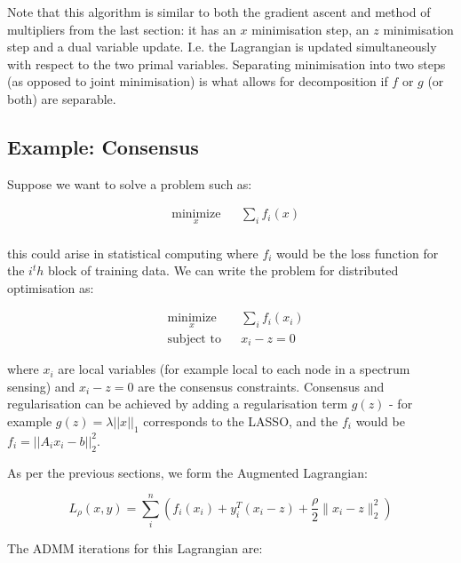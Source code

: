 \documentclass[titlepage]{article}
\begin{document}
Note that this algorithm is similar to both the gradient ascent and method of multipliers from the last section: it has an \(x\) minimisation step, an \(z\) minimisation step and a dual variable update. I.e. the Lagrangian is updated simultaneously with respect to the two primal variables. Separating minimisation into two steps (as opposed to joint minimisation) is what allows for decomposition if \(f\) or \(g\) (or both) are separable. 

\subsection{Example: Consensus}
Suppose we want to solve a problem such as:

\begin{equation*}
\begin{aligned}
& \underset{x}{\text{minimize}}
& & \sum_i f_i\left( x \right) \\
\label{consensus}
\end{aligned}
\end{equation*}

this could arise in statistical computing where \(f_i\) would be the loss function for the \(i^th\) block of training data. We can write the problem for distributed optimisation as:

\begin{equation*}
\begin{aligned}
& \underset{x}{\text{minimize}}
& & \sum_i f_i\left( x_i \right) \\
& \text{subject to}
& & x_i - z = 0
\label{admm_consensus}
\end{aligned}
\end{equation*}

where \(x_i\) are local variables (for example local to each node in a spectrum sensing) and \(x_i - z = 0\) are the consensus constraints. Consensus and regularisation can be achieved by adding a regularisation term \(g\left(z\right)\) - for example \(g\left(z\right) = \lambda||x||_1\) corresponds to the LASSO, and the \(f_i\) would be \(f_i = ||A_ix_i - b||_2^2\). 

As per the previous sections, we form the Augmented Lagrangian:

\begin{equation}
L_\rho\left(x,y\right) = \sum_i^n \left(f_i\left( x_i \right) + y_i^T\left(x_i-z\right) + \frac{\rho}{2}\|x_i-z\|_2^2\right)
\end{equation}

The ADMM iterations for this Lagrangian are:
\end{document}
